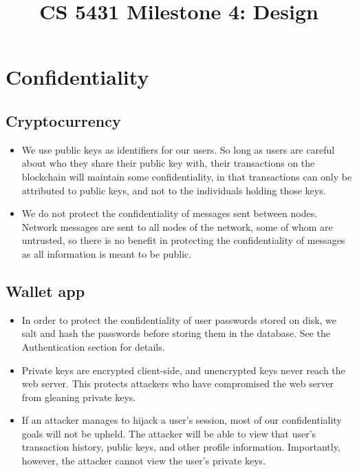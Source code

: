 \documentclass[a4paper,12pt]{article}
\title{CS 5431 Milestone 4: Design}
\author{
\iam{James Cassell}{jcc384}
\and
\iam{Evan King}{esk79}
\and
\iam{Ethan Koenig}{etk39}
\and
\iam{Eric Perdew}{ecp84}
\and
\iam{Will Ronchetti}{wrr33}
}
\begin{document}
\maketitle

\section{Confidentiality}

\subsection{Cryptocurrency}

\begin{itemize}
\item  We use public keys as identifiers for our users. So long as users are careful about who they share their public key with, their transactions on the blockchain will maintain some confidentiality, in that transactions can only be attributed to public keys, and not to the individuals holding those keys.
\item We do not protect the confidentiality of messages sent between nodes. 
Network messages are sent to all nodes of the network, some of whom are untrusted, so there is no benefit in protecting the confidentiality of messages as all information is meant to be public.
\end{itemize}

\subsection{Wallet app}

\begin{itemize}
\item In order to protect the confidentiality of user passwords stored on disk, we salt and hash the passwords before storing them in the database. See the Authentication section for details.
\item Private keys are encrypted client-side, and unencrypted keys never reach the web server. This protects attackers who have compromised the web server from gleaning private keys.
\item If an attacker manages to hijack a user's session, most of our confidentiality goals will not be upheld. The attacker will be able to view that user's transaction history, public keys, and other profile information. Importantly, however, the attacker cannot view the user's private keys.
\end{itemize}
\end{document}
